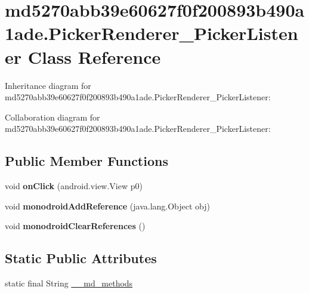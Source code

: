 \hypertarget{classmd5270abb39e60627f0f200893b490a1ade_1_1_picker_renderer___picker_listener}{}\section{md5270abb39e60627f0f200893b490a1ade.\+Picker\+Renderer\+\_\+\+Picker\+Listener Class Reference}
\label{classmd5270abb39e60627f0f200893b490a1ade_1_1_picker_renderer___picker_listener}


Inheritance diagram for md5270abb39e60627f0f200893b490a1ade.\+Picker\+Renderer\+\_\+\+Picker\+Listener\+:


Collaboration diagram for md5270abb39e60627f0f200893b490a1ade.\+Picker\+Renderer\+\_\+\+Picker\+Listener\+:
\subsection*{Public Member Functions}
\begin{DoxyCompactItemize}
\item 
\mbox{\label{classmd5270abb39e60627f0f200893b490a1ade_1_1_picker_renderer___picker_listener_a1a8816a4e33f89323152ddf1198f9650}} 
void {\bfseries on\+Click} (android.\+view.\+View p0)
\item 
\mbox{\label{classmd5270abb39e60627f0f200893b490a1ade_1_1_picker_renderer___picker_listener_ab0a8d648c8fcadf63fe47a153231ea10}} 
void {\bfseries monodroid\+Add\+Reference} (java.\+lang.\+Object obj)
\item 
\mbox{\label{classmd5270abb39e60627f0f200893b490a1ade_1_1_picker_renderer___picker_listener_a559d127bb4a4b85e43b4ab8970679f09}} 
void {\bfseries monodroid\+Clear\+References} ()
\end{DoxyCompactItemize}
\subsection*{Static Public Attributes}
\begin{DoxyCompactItemize}
\item 
static final String \hyperlink{classmd5270abb39e60627f0f200893b490a1ade_1_1_picker_renderer___picker_listener_a0364241ced938474af94b5858f99e10d}{\+\_\+\+\_\+md\+\_\+methods}
\end{DoxyCompactItemize}


